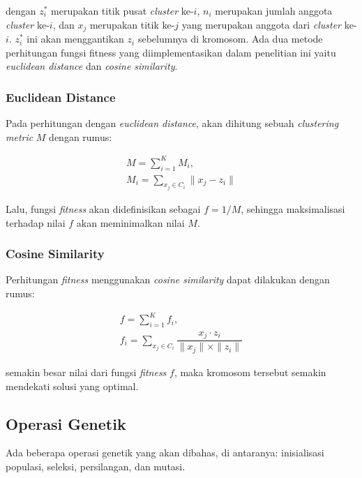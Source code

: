 \documentclass[a4paper,twoside]{article}
\begin{document}
\begin{enumerate}
dengan $z_i^*$ merupakan titik pusat \textit{cluster} ke-$i$, $n_i$ merupakan jumlah anggota \textit{cluster} ke-$i$, dan $x_j$ merupakan titik ke-$j$ yang merupakan anggota dari \textit{cluster} ke-$i$. $z_i^*$ ini akan menggantikan $z_i$ sebelumnya di kromosom. Ada dua metode perhitungan fungsi fitness yang diimplementasikan dalam penelitian ini yaitu \textit{euclidean distance} dan \textit{cosine similarity}.

\subsubsection*{Euclidean Distance}
Pada perhitungan dengan \textit{euclidean distance}, akan dihitung sebuah \textit{clustering metric} $M$ dengan rumus:

\begin{equation}
	\begin{gathered}
	M=\sum_{i=1}^K M_i , \\
	M_i=\sum_{x_j\in C_i}\parallel x_j-z_i\parallel
	\end{gathered}
\end{equation}

Lalu, fungsi \textit{fitness} akan didefinisikan sebagai $f=1/M$, sehingga maksimalisasi terhadap nilai $f$ akan meminimalkan nilai $M$.

\subsubsection*{Cosine Similarity}
Perhitungan \textit{fitness} menggunakan \textit{cosine similarity} dapat dilakukan dengan rumus:

\begin{equation}
	\begin{gathered}
	f=\sum_{i=1}^K f_i , \\
	f_i=\sum_{x_j\in C_i}\dfrac{x_j\cdot z_i}{\parallel x_j \parallel \times \parallel z_i \parallel}
	\end{gathered}
\end{equation}

semakin besar nilai dari fungsi \textit{fitness} $f$, maka kromosom tersebut semakin mendekati solusi yang optimal.

\subsection*{Operasi Genetik}
Ada beberapa operasi genetik yang akan dibahas, di antaranya: inisialisasi populasi, seleksi, persilangan, dan mutasi.


\end{enumerate}
\end{document}
